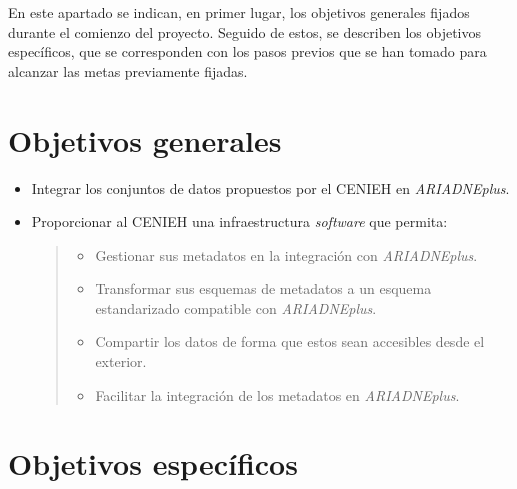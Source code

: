 
En este apartado se indican, en primer lugar, los objetivos generales
fijados durante el comienzo del proyecto. Seguido de estos, se describen
los objetivos específicos, que se corresponden con los pasos previos que
se han tomado para alcanzar las metas previamente fijadas.

\section{Objetivos generales}\label{obj.gen}

\begin{itemize}
\tightlist
\item
  Integrar los conjuntos de datos propuestos por el CENIEH en
  \emph{ARIADNEplus}.
\item
  Proporcionar al CENIEH una infraestructura \emph{software} que
  permita:

  \begin{quote}
  \begin{itemize}
  \tightlist
  \item
    Gestionar sus metadatos en la integración con \emph{ARIADNEplus}.
  \item
    Transformar sus esquemas de metadatos a un esquema estandarizado
    compatible con \emph{ARIADNEplus}.
  \item
    Compartir los datos de forma que estos sean accesibles desde el
    exterior.
  \item
    Facilitar la integración de los metadatos en \emph{ARIADNEplus}.
  \end{itemize}
  \end{quote}
\end{itemize}

\section{Objetivos específicos}\label{obj.esp}

